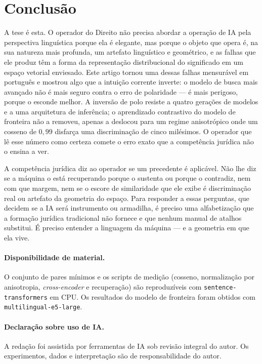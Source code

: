 \documentclass[11pt]{article}
\begin{document}
\section{Conclusão}

A tese é esta. O operador do Direito não precisa abordar a operação de IA pela
perspectiva linguística porque ela é elegante, mas porque o objeto que opera é, na
sua natureza mais profunda, um artefato linguístico e geométrico, e as falhas que
ele produz têm a forma da representação distribucional do significado em um espaço
vetorial enviesado. Este artigo tornou uma dessas falhas mensurável em português e
mostrou algo que a intuição corrente inverte: o modelo de busca mais avançado não
é mais seguro contra o erro de polaridade --- é mais perigoso, porque o esconde
melhor. A inversão de polo resiste a quatro gerações de modelos e a uma arquitetura
de inferência; o aprendizado contrastivo do modelo de fronteira não a removeu,
apenas a deslocou para um regime anisotrópico onde um cosseno de $0{,}99$ disfarça
uma discriminação de cinco milésimos. O operador que lê esse número como certeza
comete o erro exato que a competência jurídica não o ensina a ver.

A competência jurídica diz ao operador se um precedente é aplicável. Não lhe diz
se a máquina o está recuperando porque o sustenta ou porque o contradiz, nem com
que margem, nem se o escore de similaridade que ele exibe é discriminação real ou
artefato da geometria do espaço. Para responder a essas perguntas, que decidem se
a IA será instrumento ou armadilha, é preciso uma alfabetização que a formação
jurídica tradicional não fornece e que nenhum manual de atalhos substitui. É
preciso entender a linguagem da máquina --- e a geometria em que ela vive.

\paragraph{Disponibilidade de material.} O conjunto de pares mínimos e os scripts
de medição (cosseno, normalização por anisotropia, \textit{cross-encoder} e
recuperação) são reproduzíveis com \texttt{sentence-transformers} em CPU. Os
resultados do modelo de fronteira foram obtidos com \texttt{multilingual-e5-large}.

\paragraph{Declaração sobre uso de IA.} A redação foi assistida por ferramentas de
IA sob revisão integral do autor. Os experimentos, dados e interpretação são de
responsabilidade do autor.
\end{document}
